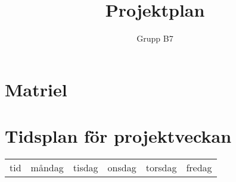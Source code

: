 \documentclass[]{article}
\title{Projektplan}
\author{Grupp B7}
\begin{document}
\maketitle



\section{Matriel}



\section{Tidsplan för projektveckan}

\begin{tabular}{r | l l l l l }
	tid & måndag & tisdag & onsdag & torsdag & fredag \\
\end{tabular}

\clearpage
\printbibliography
\end{document}
